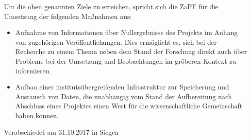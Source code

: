\documentclass[DIV=calc]{scrartcl}
\begin{document}

\pagebreak
Um die oben genannten Ziele zu erreichen, spricht sich die ZaPF für die Umsetzung der folgenden Maßnahmen aus:
\begin{itemize}
\item Aufnahme von Informationen über Nullergebnisse des Projekts im Anhang von zugehörigen Veröffentlichungen. Dies ermöglicht es, sich bei der Recherche zu einem Thema neben dem Stand der Forschung direkt auch über Probleme bei der Umsetzung und Beobachtungen im gröberen Kontext zu informieren.
\item Aufbau einer institutsübergreifenden Infrastruktur zur Speicherung und Austausch von Daten, die unabhängig vom Stand der Aufbereitung nach Abschluss eines Projektes einen Wert für die wissenschaftliche Gemeinschaft haben können.
\end{itemize}
\vfill
\begin{flushright}
Verabschiedet am 31.10.2017 in Siegen
\end{flushright}
\end{document}
